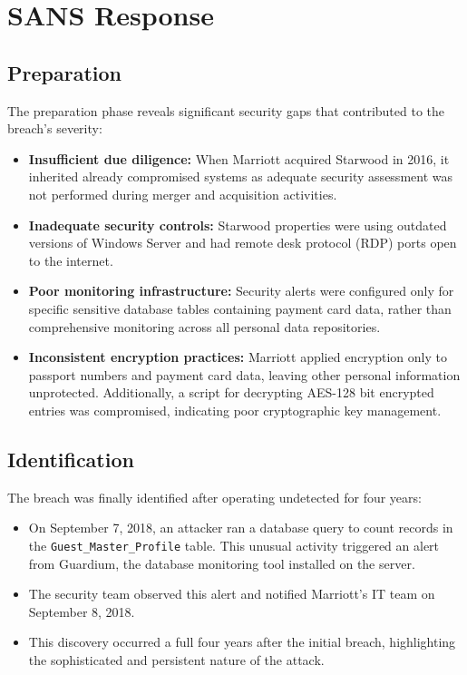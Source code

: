 \documentclass[11pt]{book}
\begin{document}
\section{SANS Response}

\subsection{Preparation}
The preparation phase reveals significant security gaps that contributed to the breach's severity:
\begin{itemize}
    \item \textbf{Insufficient due diligence:} When Marriott acquired Starwood in 2016, it inherited already compromised systems as adequate security assessment was not performed during merger and acquisition activities.
    \item \textbf{Inadequate security controls:} Starwood properties were using outdated versions of Windows Server and had remote desk protocol (RDP) ports open to the internet.
    \item \textbf{Poor monitoring infrastructure:} Security alerts were configured only for specific sensitive database tables containing payment card data, rather than comprehensive monitoring across all personal data repositories.
    \item \textbf{Inconsistent encryption practices:} Marriott applied encryption only to passport numbers and payment card data, leaving other personal information unprotected. Additionally, a script for decrypting AES-128 bit encrypted entries was compromised, indicating poor cryptographic key management.
\end{itemize}

\subsection{Identification}
The breach was finally identified after operating undetected for four years:
\begin{itemize}
    \item On September 7, 2018, an attacker ran a database query to count records in the \texttt{Guest\_Master\_Profile} table. This unusual activity triggered an alert from Guardium, the database monitoring tool installed on the server.
    \item The security team observed this alert and notified Marriott's IT team on September 8, 2018.
    \item This discovery occurred a full four years after the initial breach, highlighting the sophisticated and persistent nature of the attack.
\end{itemize}
\end{document}
